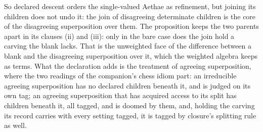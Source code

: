 \noindent So declared descent orders the single-valued Aethae as refinement, but joining its children does not undo it: the join of disagreeing determinate children is the core of the disagreeing superposition over them. The proposition keeps the two parents apart in its clauses (ii) and (iii): only in the bare case does the join hold a carving the blank lacks. That is the unweighted face of the difference between a blank and the disagreeing superposition over it, which the weighted algebra keeps as terms. What the declaration adds is the treatment of agreeing superposition, where the two readings of the companion's chess idiom part: an irreducible agreeing superposition has no declared children beneath it, and is judged on its own tag; an agreeing superposition that has acquired access to its split has children beneath it, all tagged, and is doomed by them, and, holding the carving its record carries with every setting tagged, it is tagged by closure's splitting rule as well.

